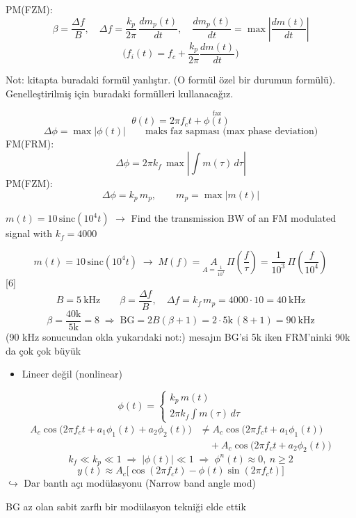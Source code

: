 \documentclass[11pt,a4paper]{article}
\begin{document}
PM(FZM):
\[ \beta=\frac{\Delta f}{B},\quad \Delta f=\frac{k_p}{2\pi}\,\frac{dm_p(t)}{dt},\quad \frac{dm_p(t)}{dt}=\max\left|\frac{dm(t)}{dt}\right| \]
\[ \Big(f_i(t)=f_c+\frac{k_p}{2\pi}\frac{dm(t)}{dt}\Big) \]

\begin{dikkat}
Not: kitapta buradaki formül yanlıştır. (O formül özel bir durumun formülü). Genelleştirilmiş için buradaki formülleri kullanacağız.
\end{dikkat}
\[ \theta(t)=2\pi f_c t+\overset{\text{faz}}{\phi(t)} \]
\[ \Delta\phi=\max|\phi(t)| \qquad \text{maks faz sapması (max phase deviation)} \]
FM(FRM):
\[ \Delta\phi=2\pi k_f\,\max\left|\int m(\tau)\,d\tau\right| \]
PM(FZM):
\[ \Delta\phi=k_p\, m_p,\qquad m_p=\max|m(t)| \]

\begin{ornek}
$m(t)=10\,\mathrm{sinc}(10^4 t)$ $\to$ Find the transmission BW of an FM modulated signal with $k_f=4000$
\end{ornek}
\[ m(t)=10\,\mathrm{sinc}(10^4 t) \;\to\; M(f)=\underset{A=\frac{1}{10^3}}{A}\,\Pi\!\left(\frac{f}{\tau}\right)=\frac{1}{10^3}\,\Pi\!\left(\frac{f}{10^4}\right) \]
[6]
\[ B=5\ \mathrm{kHz}\qquad \beta=\frac{\Delta f}{B},\quad \Delta f=k_f\, m_p=4000\cdot10=40\ \mathrm{kHz} \]
\[ \beta=\frac{40\mathrm{k}}{5\mathrm{k}}=8 \;\Rightarrow\; \mathrm{BG}=2B(\beta+1)=2\cdot 5\mathrm{k}\,(8+1)=90\ \mathrm{kHz} \]
(90 kHz sonucundan okla yukarıdaki not:) mesajın BG'si 5k iken FRM'ninki 90k da çok çok büyük

\begin{itemize}
\item Lineer değil (nonlinear)
\end{itemize}
\[ \phi(t)=\begin{cases} k_p\, m(t)\\ 2\pi k_f\displaystyle\int m(\tau)\,d\tau \end{cases} \]
\begin{align*}
A_c\cos\big(2\pi f_c t+a_1\phi_1(t)+a_2\phi_2(t)\big)&\neq A_c\cos\big(2\pi f_c t+a_1\phi_1(t)\big)\\
&\quad+A_c\cos\big(2\pi f_c t+a_2\phi_2(t)\big)
\end{align*}
\[ k_f\ll k_p\ll 1 \;\Rightarrow\; |\phi(t)|\ll1 \;\Rightarrow\; \phi^n(t)\approx0,\ n\ge2 \]
\[ y(t)\approx A_c\big[\cos(2\pi f_c t)-\phi(t)\sin(2\pi f_c t)\big] \]
$\hookrightarrow$ Dar bantlı açı modülasyonu (Narrow band angle mod)

BG az olan sabit zarflı bir modülasyon tekniği elde ettik
\end{document}
